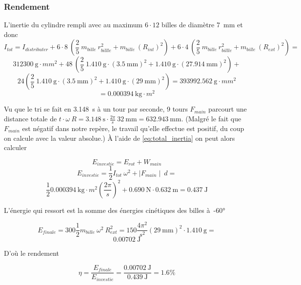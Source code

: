 \subsubsection{Rendement}
L'inertie du cylindre rempli avec au maximum $6 \cdot 12$ billes de diamètre \SI{7}{\milli\metre} et donc
    \[I_{tot} = I_{distributer} + 6\cdot8 \ (\frac{2}{5} \ m_{bille} \ r_{billle}^{2} + m_{bille} \ (R_{int})^2) + 6\cdot4 \ (\frac{2}{5} \ m_{bille} \ r_{billle}^{2} + m_{bille} \ (R_{ext})^2) = \]
    \[\SI{312300}{\g\cdot mm^2} + 48\ (\frac{2}{5}\ \SI{1.410}{\g}\cdot (\SI{3.5}{\milli\metre})^{2} + \SI{1.410}{\g}\cdot (\SI{27.914}{\milli\metre})^2) + \]
    \[24 (\frac{2}{5} \ \SI{1.410}{\g}\cdot (\SI{3.5}{\milli\metre})^2 + \SI{1.410}{\g}\cdot (\SI{29}{\milli\metre})^2) = \SI{393992.562}{\g\cdot mm^2}\]
\begin{equation}    
    = \SI{0.000394}{\kg\cdot m^2}
\label{eq:total_inertia}
\end{equation}

Vu que le tri se fait en \SI{3.148}{\s} à un tour par seconde, 9 tours $F_{main}$ parcourt une distance totale de $t \cdot \omega \ R = \SI{3.148}{\s}\cdot \frac{2\pi}{s}\ \SI{32}{\milli\metre} = \SI{632.943}{\milli\metre}$. (Malgré le fait que $F_{main}$ est négatif dans notre repère, le travail qu'elle effectue est positif, du coup on calcule avec la valeur absolue.)
À l'aide de \ref{eq:total_inertia} on peut alors calculer

\[E_{investie} = E_{rot} + W_{main}\]
\[E_{investie} = \frac{1}{2}I_{tot}\ \omega^{2} + \mid F_{main}\mid \ d = \]
\[\frac{1}{2}\SI{0.000394}{\kg\cdot m^2}(\frac{2\pi}{s})^{2} + \SI{0.690}{\N}\cdot \SI{0.632}{\metre} = \SI{0.437}{\J}\]

L'énergie qui ressort est la somme des énergies cinétiques des billes à~\ang{-60}

\[E_{finale} = 300 \frac{1}{2} m_{bille}\ \omega^{2} \ R_{ext}^{2} = 150\frac{4\pi^2}{s^2} (\SI{29}{\milli\metre})^2 \cdot \SI{1.410}{\g} =\]
\[\SI{0.00702}{\J}\]

D'où le rendement

\[\eta = \frac{E_{finale}}{E_{investie}} = \frac{\SI{0.00702}{\J}}{\SI{0.439}{\J}} = 1.6\% \]

